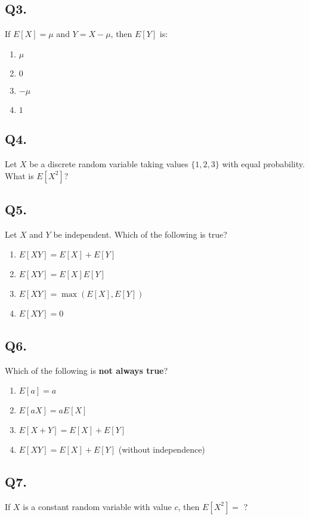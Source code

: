 \subsection*{Q3.}
If $E[X] = \mu$ and $Y = X - \mu$, then $E[Y]$ is:
\begin{enumerate}[label=(\alph*)]
    \item $\mu$
    \item $0$
    \item $- \mu$
    \item $1$
\end{enumerate}

\subsection*{Q4.}
Let $X$ be a discrete random variable taking values $\{1, 2, 3\}$ with equal probability. What is $E[X^2]$?

\subsection*{Q5.}
Let $X$ and $Y$ be independent. Which of the following is true?
\begin{enumerate}[label=(\alph*)]
    \item $E[XY] = E[X] + E[Y]$
    \item $E[XY] = E[X]E[Y]$
    \item $E[XY] = \max(E[X], E[Y])$
    \item $E[XY] = 0$
\end{enumerate}

\subsection*{Q6.}
Which of the following is \textbf{not always true}?
\begin{enumerate}[label=(\alph*)]
    \item $E[a] = a$
    \item $E[aX] = aE[X]$
    \item $E[X + Y] = E[X] + E[Y]$
    \item $E[XY] = E[X] + E[Y]$ (without independence)
\end{enumerate}

\subsection*{Q7.}
If $X$ is a constant random variable with value $c$, then $E[X^2] = $ ?


